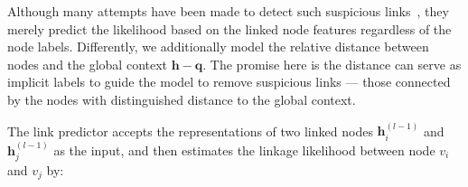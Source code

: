 Although many attempts have been made to detect such suspicious links~\cite{zhang2019key, dou2020enhancing}, 
they merely predict the likelihood based on the linked node features regardless of the node labels. 
Differently, we additionally model the relative distance between nodes and the global context $\boldsymbol{h}-\boldsymbol{q}$. 
The promise here is the distance can serve as implicit labels to guide the model to remove suspicious links --- those connected by the nodes with distinguished distance to the global context.


The link predictor accepts the representations of two linked nodes $\boldsymbol{h}_i^{(l-1)}$ and $\boldsymbol{h}_j^{(l-1)}$ as the input, and then estimates the linkage likelihood between node $v_i$ and $v_j$ by:


